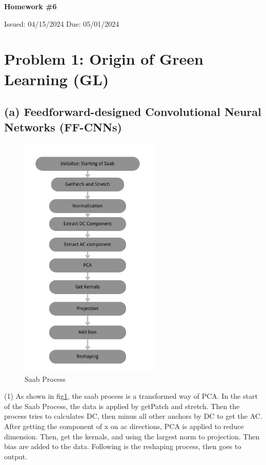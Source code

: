 \documentclass[12pt]{article}
\begin{document}
	
	\begin{center}
		\Large
		\textbf{Homework \#6}
		
		\vspace{0.2cm}
		\normalsize
		Issued: 04/15/2024 \hfill Due: 05/01/2024
	\end{center}
\section*{Problem 1: Origin of Green Learning (GL)}
\subsection*{(a) Feedforward-designed Convolutional Neural Networks (FF-CNNs)}
	\begin{figure}[H]
		\centering
		\includegraphics[width=0.6\textwidth]{saab.png}
	\caption{Saab Process}
	\label{p1a}
\end{figure}
	(1) As shown in fig\ref{p1a}, the saab process is a transformed way of PCA. In the start of the Saab Process, the data is applied by getPatch and stretch. Then the process tries to calculates DC, then minus all other anchors by DC to get the AC. After getting the component of x on ac directions, PCA is applied to reduce dimension. Then, get the kernals, and using the largest norm to projection. Then bias are added to the data. Following is the reshaping process, then goes to output. 
\end{document}
